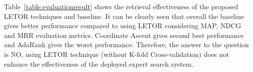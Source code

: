\begin{table}
\centering
{}
\caption{Evaluation Results} \label{table:evaluationresult}
\end{table}

Table~\ref{table:evaluationresult} shows the retrieval effectiveness of the proposed LETOR techniques and baseline. It can be clearly seen
that overall the baseline gives better performance compared to using LETOR considering MAP, NDCG and MRR evaluation metrics. Coordinate Ascent gives second best 
performance and AdaRank gives the worst performance. Therefore, the answer to the question is NO, using LETOR technique (without K-fold Cross-validation) does not enhance the 
effectiveness of the deployed expert search system.

